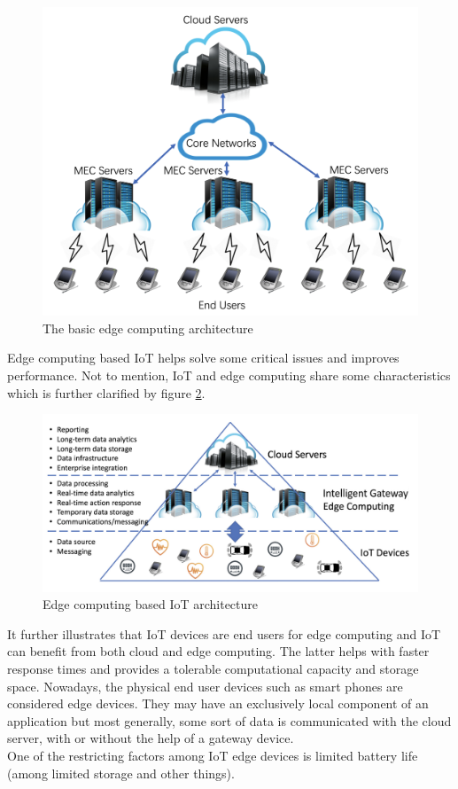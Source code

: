 \begin{figure}
    \begin{center}
        \includegraphics[scale=0.35]{Figs/edge_arch.png}    
    \end{center}
    \caption{The basic edge computing architecture}
    \label{fig:edgearch}
\end{figure}

Edge computing based IoT helps solve some critical issues and improves performance. Not to mention, IoT and 
edge computing share some characteristics which is further clarified by figure \ref{fig:edgeiot}. 
\begin{figure}
    \begin{center}
        \includegraphics[scale=0.35]{Figs/edge_iot.png}    
    \end{center}
    \caption{Edge computing based IoT architecture}
    \label{fig:edgeiot}
\end{figure}

It further illustrates that IoT devices are end users for edge computing and IoT can benefit from both 
cloud and edge computing. The latter helps with faster response times and provides a tolerable computational 
capacity and storage space. Nowadays, the physical end user devices such as smart phones are considered 
edge devices. They may have an exclusively local component of an application but most generally, some sort of 
data is communicated with the cloud server, with or without the help of a gateway device. \\
One of the restricting factors among IoT edge devices is limited battery life (among limited storage and other things). 
